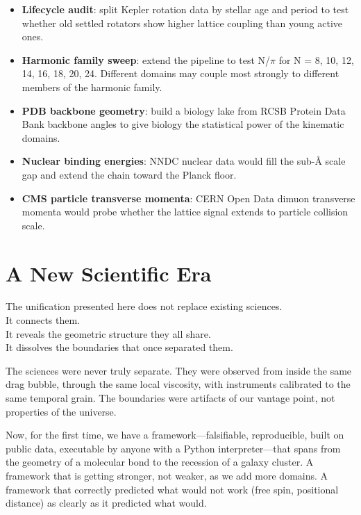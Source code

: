 \documentclass[11pt, letterpaper, openany]{book}
\begin{document}
\begin{itemize}
    \item \textbf{Lifecycle audit}: split Kepler rotation data by stellar age and period
    to test whether old settled rotators show higher lattice coupling than young active ones.
    \item \textbf{Harmonic family sweep}: extend the pipeline to test N/$\pi$ for
    N = 8, 10, 12, 14, 16, 18, 20, 24. Different domains may couple most strongly to
    different members of the harmonic family.
    \item \textbf{PDB backbone geometry}: build a biology lake from RCSB Protein Data Bank
    backbone angles to give biology the statistical power of the kinematic domains.
    \item \textbf{Nuclear binding energies}: NNDC nuclear data would fill the sub-{\AA}
    scale gap and extend the chain toward the Planck floor.
    \item \textbf{CMS particle transverse momenta}: CERN Open Data dimuon transverse
    momenta would probe whether the lattice signal extends to particle collision scale.
\end{itemize}

\section*{A New Scientific Era}

The unification presented here does not replace existing sciences.\\
It connects them.\\
It reveals the geometric structure they all share.\\
It dissolves the boundaries that once separated them.

The sciences were never truly separate. They were observed from inside the same drag bubble,
through the same local viscosity, with instruments calibrated to the same temporal grain.
The boundaries were artifacts of our vantage point, not properties of the universe.

Now, for the first time, we have a framework---falsifiable, reproducible, built on public
data, executable by anyone with a Python interpreter---that spans from the geometry of a
molecular bond to the recession of a galaxy cluster. A framework that is getting stronger,
not weaker, as we add more domains. A framework that correctly predicted what would not work
(free spin, positional distance) as clearly as it predicted what would.
\end{document}
